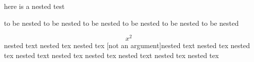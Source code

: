 here is a nested test
\begin{one}
	to be nested to be nested
	to be nested to be nested
	to be nested to be nested
	\begin{two}
		\[ x^2\]
		nested text nested tex nested tex [not an argument]nested text nested tex nested tex
		nested text nested tex nested tex
		nested text nested tex nested tex
	\end{two}
\end{one}
